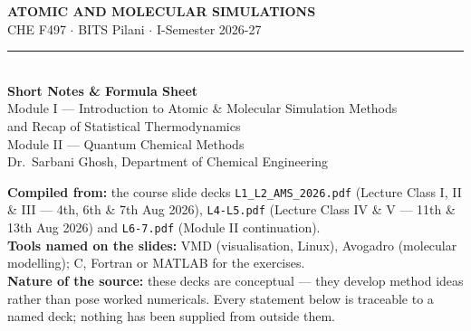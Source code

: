 \documentclass[10pt,a4paper]{article}
\newenvironment{daybox}{%
  \par\addvspace{4pt}\noindent\begin{lrbox}{\spboxa}%
  \begin{minipage}{\dimexpr\linewidth-12pt\relax}\small\color{notecol}%
}{\end{minipage}\end{lrbox}%
  \fcolorbox{boxframe}{white}{\usebox{\spboxa}}\par\addvspace{6pt}}
\providecommand{\textperiodcentered}{\ensuremath{\cdot}}
\begin{document}

\begin{center}
{\LARGE\bfseries\color{accent} ATOMIC AND MOLECULAR SIMULATIONS}\\[2pt]
{\color{accent2} CHE F497 \textperiodcentered{} BITS Pilani \textperiodcentered{} I-Semester 2026-27}\\[4pt]
{\color{rule}\rule{0.6\linewidth}{0.8pt}}\\[6pt]
{\Large\bfseries\color{accent} Short Notes \& Formula Sheet}\\[4pt]
{\color{accent2} Module I --- Introduction to Atomic \& Molecular Simulation Methods\\
 and Recap of Statistical Thermodynamics\\
 Module II --- Quantum Chemical Methods}\\[3pt]
{\footnotesize\color{notecol} Dr.\ Sarbani Ghosh, Department of Chemical Engineering}
\end{center}

\vspace{2mm}
\begin{daybox}
\textbf{Compiled from:} the course slide decks \texttt{L1\_L2\_AMS\_2026.pdf} (Lecture Class I, II \& III --- 4th, 6th \& 7th Aug 2026), \texttt{L4-L5.pdf} (Lecture Class IV \& V --- 11th \& 13th Aug 2026) and \texttt{L6-7.pdf} (Module II continuation).\\[2pt]
\textbf{Tools named on the slides:} VMD (visualisation, Linux), Avogadro (molecular modelling); C, Fortran or MATLAB for the exercises.\\[2pt]
\textbf{Nature of the source:} these decks are conceptual --- they develop method ideas rather than pose worked numericals. Every statement below is traceable to a named deck; nothing has been supplied from outside them.
\end{daybox}
\end{document}
